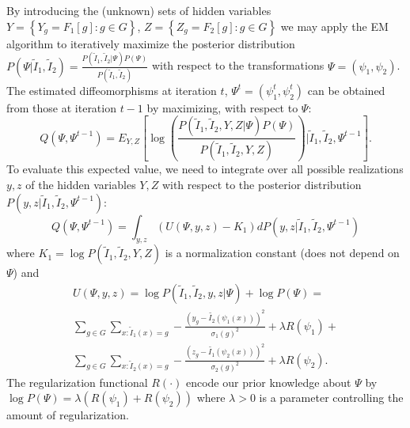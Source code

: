 \documentclass[11pt]{article}
\begin{document}
By introducing the (unknown) sets of hidden variables $Y = \left\lbrace Y_{g}=F_{1}[g] : g\in G \right\rbrace$, $Z = \left\lbrace Z_g = F_{2}[g] : g \in G\right\rbrace$ we may apply the EM algorithm to iteratively maximize the posterior distribution $P(\Psi | \tilde{I}_{1}, \tilde{I}_{2}) = \frac{P(\tilde{I}_{1}, \tilde{I}_{2} | \Psi)P(\Psi)}{P(\tilde{I}_{1}, \tilde{I}_{2})}$ with respect to the transformations $\Psi = (\psi_{1}, \psi_{2})$. The estimated diffeomorphisms at iteration $t$, $\Psi^{t} = \left( \psi_{1}^{t}, \psi_{2}^{t}\right)$ can be obtained from those at iteration $t-1$ by maximizing, with respect to $\Psi$:
\begin{equation}
	Q(\Psi, \Psi^{t-1}) = E_{Y,Z}\left[\log \left( \frac{P(\tilde{I}_{1}, \tilde{I}_{2}, Y, Z|\Psi)P(\Psi)}{P(\tilde{I}_{1}, \tilde{I}_{2}, Y, Z)}\right) | \tilde{I}_{1}, \tilde{I}_{2}, \Psi^{t-1}\right].
\end{equation}
To evaluate this expected value, we need to integrate over all possible realizations $y, z$ of the hidden variables $Y, Z$ with respect to the posterior distribution $P(y,z| \tilde{I}_{1}, \tilde{I}_{2}, \Psi^{t-1})$:
\begin{equation}\label{eq:expected_value}
Q(\Psi, \Psi^{t-1}) = \int_{y,z} (U(\Psi, y, z) - K_1)dP(y,z| \tilde{I}_{1}, \tilde{I}_{2}, \Psi^{t-1})
\end{equation}
where $K_{1} =\log P(\tilde{I}_{1}, \tilde{I}_{2}, Y, Z)$ is a normalization constant (does not depend on $\Psi$) and
\begin{align}\label{eq:SyNEM_objective}
	U(\Psi, y, z) = \log P(\tilde{I}_{1}, \tilde{I}_{2}, y, z|\Psi) + \log P(\Psi)=\\
    \nonumber\sum_{g\in G} \sum_{x : \tilde{I}_{1}(x) = g} -\frac{\left(y_g - \tilde{I_{2}}(\psi_{1}(x))\right)^{2}}{\sigma_{1}(g)^{2}} + \lambda R(\psi_{1})+\\
    \nonumber\sum_{g\in G} \sum_{x : \tilde{I}_{2}(x) = g} -\frac{\left(z_g - \tilde{I_{1}}(\psi_{2}(x))\right)^{2}}{\sigma_{2}(g)^{2}} + \lambda R(\psi_{2}).
\end{align}
The regularization functional $R(\cdot)$ encode our prior knowledge about $\Psi$ by $\log P(\Psi) = \lambda \left( R(\psi_{1}) + R(\psi_{2})\right)$ where $\lambda > 0$ is a parameter controlling the amount of regularization.\\
\end{document}
